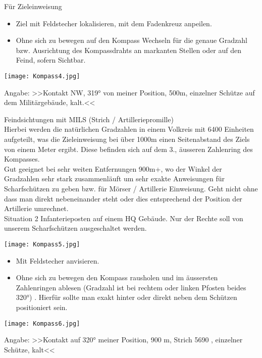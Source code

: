 	Für Zieleinweisung
		\begin{itemize}
 			\item Ziel mit Feldstecher lokalisieren, mit dem Fadenkreuz anpeilen.
			\item Ohne sich zu bewegen auf den Kompass Wechseln für die genaue Gradzahl bzw. Ausrichtung des Kompassdrahts an markanten Stellen oder auf den Feind, sofern Sichtbar.
		\end{itemize}

\begin{minipage}[t]{1\textwidth}
	\texttt{[image: Kompass4.jpg]}
\end{minipage}
	Angabe: >>Kontakt NW, 319° von meiner Position, 500m, einzelner Schütze auf dem Militärgebäude, kalt.<<

	Feindsichtungen mit MILS (Strich / Artilleriepromille) \\

	Hierbei werden die natürlichen Gradzahlen in einem Volkreis mit 6400 Einheiten aufgeteilt, was die Zieleinweisung bei über 1000m einen Seitenabstand des Ziels von einem Meter ergibt. Diese befinden sich auf dem 3., äusseren Zahlenring des Kompasses.  \\

	Gut geeignet bei sehr weiten Entfernungen 900m+, wo der Winkel der Gradzahlen sehr stark zusammenläuft um sehr exakte Anweisungen für Scharfschützen zu geben bzw. für Mörser / Artillerie Einweisung. Geht nicht ohne dass man direkt nebeneinander steht oder dies entsprechend der Position der Artillerie umrechnet.  \\

 

	Situation 2 Infanterieposten auf einem HQ Gebäude. Nur der Rechte soll von unserem Scharfschützen ausgeschaltet werden.  \\
\begin{minipage}[t]{1\textwidth}
	\texttt{[image: Kompass5.jpg]}
\end{minipage}

		\begin{itemize}
 			\item Mit Feldstecher anvisieren.
			\item Ohne sich zu bewegen den Kompass rausholen und im äussersten Zahlenringen ablesen (Gradzahl ist bei rechtem oder linken Pfosten beides 320°) . Hierfür sollte man exakt hinter oder direkt neben dem Schützen positioniert sein.
		\end{itemize}

\begin{minipage}[t]{1\textwidth}
	\texttt{[image: Kompass6.jpg]}
\end{minipage}
Angabe: >>Kontakt auf 320° meiner Position, 900 m, Strich 5690 , einzelner Schütze, kalt<<